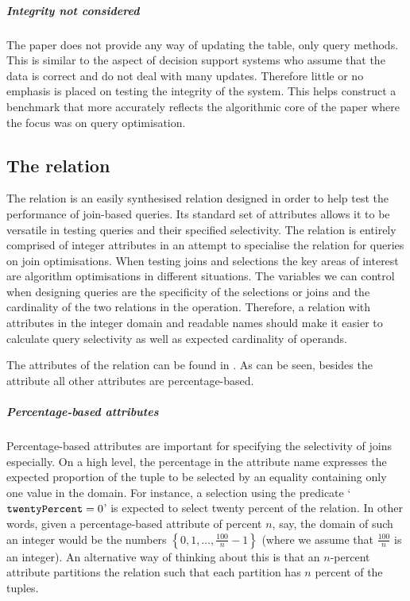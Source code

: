 \subparagraph{Integrity not considered} The paper \relalg{} does not provide any way of
updating the table, only query methods. This is similar to the aspect of
decision support systems who assume that the data is correct and
do not deal with many updates. Therefore little or no emphasis is placed on
testing the integrity of the system. This helps construct a benchmark that more
accurately reflects the algorithmic core of the paper where the focus was on
query optimisation.

\subsection{The  relation}\label{sec:benchmark:joinbench}
The  relation is an easily synthesised relation designed in
order to help test the performance of join-based queries. Its standard set of
attributes allows it to be versatile in testing queries and their specified selectivity.
The relation is entirely comprised of integer attributes in an
attempt to specialise the relation for queries on join optimisations. When
testing joins and selections the key areas of interest are algorithm
optimisations in different situations. The variables we can control when
designing queries are the specificity of the selections or joins and the cardinality
of the two relations in the operation. Therefore, a relation with attributes in
the integer domain and readable names should make it easier to calculate
query selectivity as well as expected cardinality of operands.

The attributes of the  relation can be found in
. As can be seen, besides the
 attribute all other attributes are percentage-based.

\subparagraph{Percentage-based attributes} Percentage-based attributes are
important for specifying the selectivity of joins especially. On a high level,
the percentage in the attribute name expresses the expected proportion of the
tuple to be selected by an equality containing only one value in the domain. For
instance, a selection using the predicate `$\mathtt{twentyPercent} =
0$' is expected to select twenty percent of the relation. In other words, given a
percentage-based attribute of percent $n$, say, the domain of such an integer
would be the numbers $\left\{0, 1, \ldots, \frac{100}{n} - 1\right\}$ (where we
assume that $\frac{100}{n}$ is an integer). An alternative way of thinking about
this is that an $n$-percent attribute partitions the relation such that each
partition has $n$ percent of the tuples.

